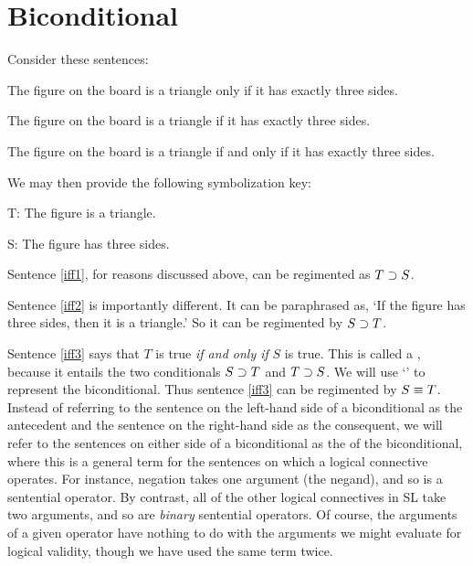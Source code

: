 \section{Biconditional}
  \label{sec.Bicon}

Consider these sentences:
\begin{earg}
\item[\ex{iff1}] The figure on the board is a triangle only if it has exactly three sides.
\item[\ex{iff2}] The figure on the board is a triangle if it has exactly three sides.
\item[\ex{iff3}] The figure on the board is a triangle if and only if it has exactly three sides.
\end{earg}

We may then provide the following symbolization key:

\begin{ekey}
\item[T:] The figure is a triangle.
\item[S:] The figure has three sides.
\end{ekey}

Sentence \ref{iff1}, for reasons discussed above, can be regimented as $T\supset S$.

Sentence \ref{iff2} is importantly different.
It can be paraphrased as, `If the figure has three sides, then it is a triangle.'
So it can be regimented by $S\supset T$.

Sentence \ref{iff3} says that $T$ is true \emph{if and only if} $S$ is true.
This is called a , because it entails the two conditionals $S\supset T$ and $T \supset S$.
We will use `\eiff' to represent the biconditional.
Thus sentence \ref{iff3} can be regimented by $S \equiv T$.
Instead of referring to the sentence on the left-hand side of a biconditional as the antecedent and the sentence on the right-hand side as the consequent, we will refer to the sentences on either side of a biconditional as the  of the biconditional, where this is a general term for the sentences on which a logical connective operates.
For instance, negation takes one argument (the negand), and so is a  sentential operator.
By contrast, all of the other logical connectives in SL take two arguments, and so are \textit{binary} sentential operators.
Of course, the arguments of a given operator have nothing to do with the arguments we might evaluate for logical validity, though we have used the same term twice.

